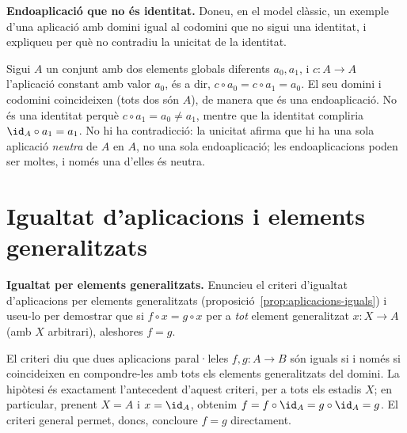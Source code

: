 \begin{exercici}
\textbf{Endoaplicació que no és identitat.} Doneu, en el model clàssic, un exemple d'una aplicació amb domini igual al codomini que no sigui una identitat, i expliqueu per què no contradiu la unicitat de la identitat.
\end{exercici}
\begin{solucio}
Sigui \(A\) un conjunt amb dos elements globals diferents \(a_0,a_1\), i \(c\colon A\to A\) l'aplicació constant amb valor \(a_0\), és a dir, \(c\circ a_0=c\circ a_1=a_0\). El seu domini i codomini coincideixen (tots dos són \(A\)), de manera que és una endoaplicació. No és una identitat perquè \(c\circ a_1=a_0\neq a_1\), mentre que la identitat compliria \(\id_A\circ a_1=a_1\). No hi ha contradicció: la unicitat afirma que hi ha una sola aplicació \emph{neutra} de \(A\) en \(A\), no una sola endoaplicació; les endoaplicacions poden ser moltes, i només una d'elles és neutra.
\end{solucio}

\section{Igualtat d'aplicacions i elements generalitzats}\label{prac:igualtat}

\begin{exercici}
\textbf{Igualtat per elements generalitzats.} Enuncieu el criteri d'igualtat d'aplicacions per elements generalitzats (proposició~\ref{prop:aplicacions-iguals}) i useu-lo per demostrar que si \(f\circ x=g\circ x\) per a \emph{tot} element generalitzat \(x\colon X\to A\) (amb \(X\) arbitrari), aleshores \(f=g\).
\end{exercici}
\begin{solucio}
El criteri diu que dues aplicacions paral·leles \(f,g\colon A\to B\) són iguals si i només si coincideixen en compondre-les amb tots els elements generalitzats del domini. La hipòtesi és exactament l'antecedent d'aquest criteri, per a tots els estadis \(X\); en particular, prenent \(X=A\) i \(x=\id_A\), obtenim \(f=f\circ\id_A=g\circ\id_A=g\). El criteri general permet, doncs, concloure \(f=g\) directament.
\end{solucio}

